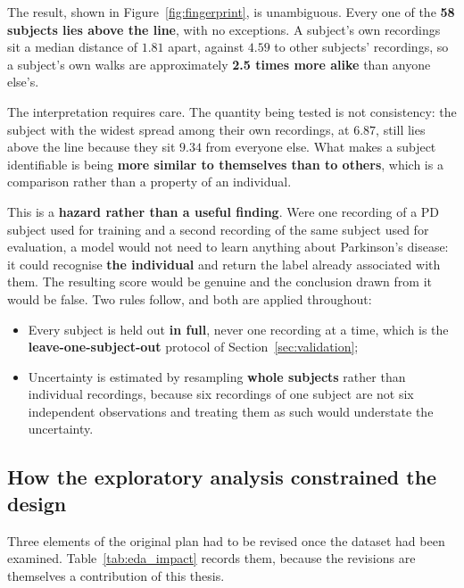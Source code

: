 The result, shown in Figure~\ref{fig:fingerprint}, is unambiguous. Every one
of the \textbf{58 subjects lies above the
line}, with no exceptions. A subject's own recordings sit a median distance of
$1.81$ apart, against $4.59$ to other subjects' recordings, so a subject's own
walks are approximately \textbf{2.5 times more alike} than anyone else's.

The interpretation requires care. The quantity being tested is not consistency:
the subject with the widest spread among their own recordings, at $6.87$, still
lies above the line because they sit $9.34$ from everyone else. What makes a
subject identifiable is being \textbf{more similar to themselves than to
others}, which is a comparison rather than a property of an individual.

This is a \textbf{hazard rather than a useful finding}. Were one recording of a
PD subject used for training and a second recording of the same subject used for
evaluation, a model would not need to learn anything about Parkinson's disease:
it could recognise \textbf{the individual} and return the label already
associated with them. The resulting score would be genuine and the conclusion
drawn from it would be false. Two rules follow, and both are applied throughout:

\begin{itemize}
  \item Every subject is held out \textbf{in full}, never one recording at a
        time, which is the \textbf{leave-one-subject-out} protocol of
        Section~\ref{sec:validation};
  \item Uncertainty is estimated by resampling \textbf{whole subjects} rather
        than individual recordings, because six recordings of one subject are
        not six independent observations and treating them as such would
        understate the uncertainty.
\end{itemize}

\subsection{How the exploratory analysis constrained the design}
\label{sec:res_eda_impact}

Three elements of the original plan had to be revised once the dataset had been
examined. Table~\ref{tab:eda_impact} records them, because the revisions are
themselves a contribution of this thesis.


